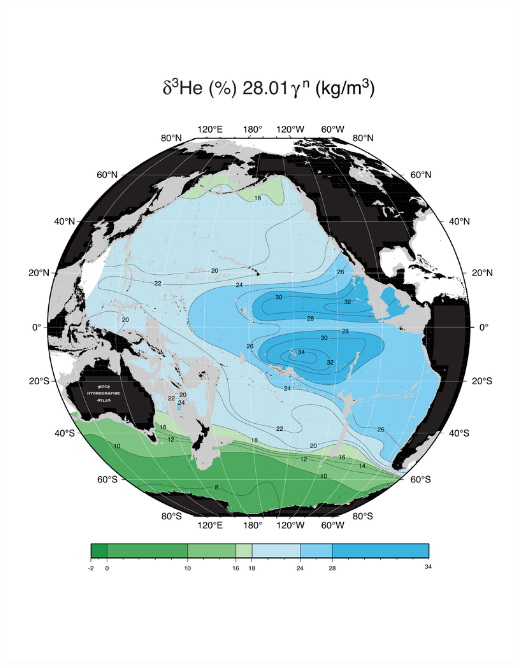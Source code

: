 \documentclass{beamer}
\begin{document}
\begin{frame}[plain,t]
\begin{columns}
\begin{column}{0.33\textwidth}
        \includegraphics[width=\textwidth]{delhe3_isopyc_final_pdf/pac2801_delhe3_final.pdf}
      \end{column}
    \end{columns} 
\end{frame}
\end{document}
